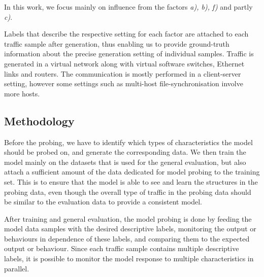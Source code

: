 \documentclass[conference]{IEEEtran}
\begin{document}
\vspace{0.2cm}

In this work, we focus mainly on influence from the factors \textit{a), b), f)} and partly \textit{c)}.


Labels that describe the respective setting for each factor are attached to each traffic sample after generation, thus enabling us to provide ground-truth information about the precise generation setting of individual samples. Traffic is generated in a virtual network along with virtual software switches, Ethernet links and routers. The communication is mostly performed in a client-server setting, however some settings such as multi-host file-synchronisation involve more hosts. 


\subsection{Methodology}

Before the probing, we have to identify which types of characteristics the model should be probed on, and generate the corresponding data. We then train the model mainly on the datasets that is used for the general evaluation, but also attach a sufficient amount of the data dedicated for model probing to the training set. This is to ensure that the model is able to see and learn the structures in the probing data, even though the overall type of traffic in the probing data should be similar to the evaluation data to provide a consistent model.

After training and general evaluation, the model probing is done by feeding the model data samples with the desired descriptive labels, monitoring the output or behaviours in dependence of these labels, and comparing them to the expected output or behaviour. Since each traffic sample contains multiple descriptive labels, it is possible to monitor the model response to multiple characteristics in parallel.



\end{document}

